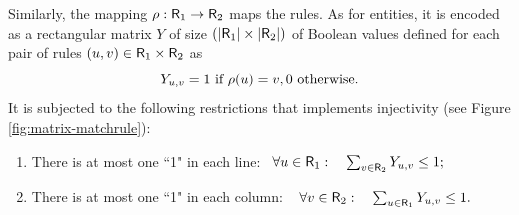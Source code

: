 \documentclass[a4paper,twoside]{article}
\begin{document}
Similarly, the mapping $\rho: \mathsf{R}_1 \to \mathsf{R}_2$ maps the rules. As for entities, it is encoded as a rectangular matrix $Y$ of size $(|\mathsf{R}_1| \times |\mathsf{R}_2|)$ of Boolean values defined for each pair of rules $(u,v)\in \mathsf{R}_1 \times \mathsf{R}_2$  as
$$Y_{u,v} =1 \text{ if } \rho(u)=v, 0 \text{ otherwise.}$$
It is subjected to the following restrictions that implements injectivity (see Figure \ref{fig:matrix-matchrule}):
\begin{enumerate}
\item There is at most one ``1" in  each line:~
$
%
 \forall u \in \Ru_1: \quad
   \sum_{v \in \Ru_2} Y_{u,v} \leq 1;
  $
  
 \item There is at most one ``1" in  each column: ~ 
$
  \forall v \in \mathsf{R}_2: \quad
  \sum_{u \in \mathsf{R}_1} Y_{u,v} \leq 1. 
  $
\end{enumerate}

\end{document}
